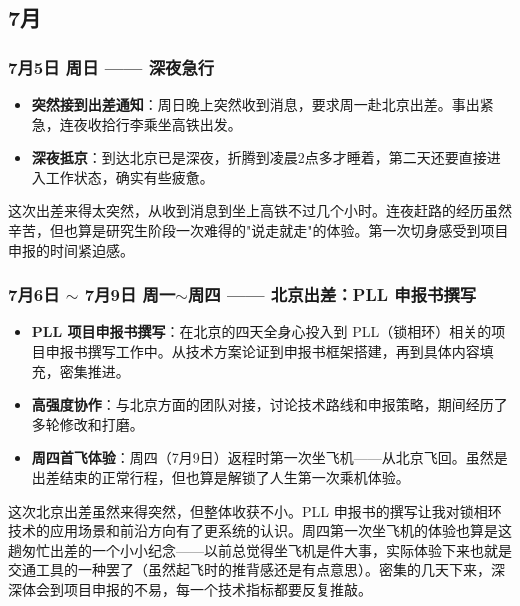\subsection{7月}

\subsubsection{7月5日 周日 —— 深夜急行}

\begin{itemize}
  \item \textbf{突然接到出差通知}：周日晚上突然收到消息，要求周一赴北京出差。事出紧急，连夜收拾行李乘坐高铁出发。
  \item \textbf{深夜抵京}：到达北京已是深夜，折腾到凌晨2点多才睡着，第二天还要直接进入工作状态，确实有些疲惫。
\end{itemize}

\begin{personalnote}
这次出差来得太突然，从收到消息到坐上高铁不过几个小时。连夜赶路的经历虽然辛苦，但也算是研究生阶段一次难得的"说走就走"的体验。第一次切身感受到项目申报的时间紧迫感。
\end{personalnote}

\subsubsection{7月6日 $\sim$ 7月9日 周一$\sim$周四 —— 北京出差：PLL 申报书撰写}

\begin{itemize}
  \item \textbf{PLL 项目申报书撰写}：在北京的四天全身心投入到 PLL（锁相环）相关的项目申报书撰写工作中。从技术方案论证到申报书框架搭建，再到具体内容填充，密集推进。
  \item \textbf{高强度协作}：与北京方面的团队对接，讨论技术路线和申报策略，期间经历了多轮修改和打磨。
  \item \textbf{周四首飞体验}：周四（7月9日）返程时第一次坐飞机——从北京飞回。虽然是出差结束的正常行程，但也算是解锁了人生第一次乘机体验。
\end{itemize}

\begin{personalnote}
这次北京出差虽然来得突然，但整体收获不小。PLL 申报书的撰写让我对锁相环技术的应用场景和前沿方向有了更系统的认识。周四第一次坐飞机的体验也算是这趟匆忙出差的一个小小纪念——以前总觉得坐飞机是件大事，实际体验下来也就是交通工具的一种罢了（虽然起飞时的推背感还是有点意思）。密集的几天下来，深深体会到项目申报的不易，每一个技术指标都要反复推敲。
\end{personalnote}

